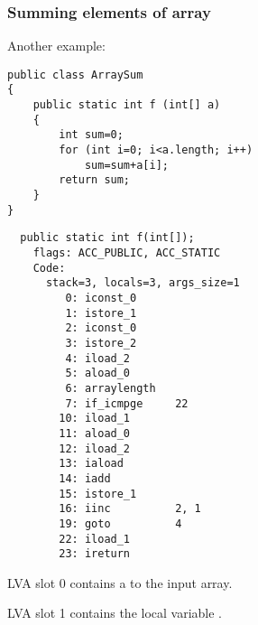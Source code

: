 \subsubsection{Summing elements of array}

Another example:

\begin{lstlisting}[style=customjava]
public class ArraySum
{
	public static int f (int[] a)
	{
		int sum=0;
		for (int i=0; i<a.length; i++)
			sum=sum+a[i];
		return sum;
	}
}
\end{lstlisting}

\begin{lstlisting}
  public static int f(int[]);
    flags: ACC_PUBLIC, ACC_STATIC
    Code:
      stack=3, locals=3, args_size=1
         0: iconst_0      
         1: istore_1      
         2: iconst_0      
         3: istore_2      
         4: iload_2       
         5: aload_0       
         6: arraylength   
         7: if_icmpge     22
        10: iload_1       
        11: aload_0       
        12: iload_2       
        13: iaload        
        14: iadd          
        15: istore_1      
        16: iinc          2, 1
        19: goto          4
        22: iload_1       
        23: ireturn       
\end{lstlisting}

\ac{LVA} slot 0 contains a  to the input array.

\ac{LVA} slot 1 contains the local variable .

